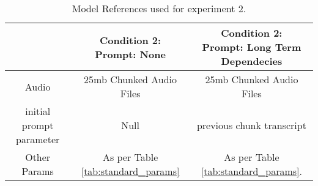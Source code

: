 

\begin{table}[ht]
    \centering
    \begin{tabular}{|c|c|c|}
        \hline
        &
        \makecell{\textbf{Condition 2:} \\Prompt: None} & \makecell{\textbf{Condition 2:} \\Prompt: Long Term Dependecies} \\
        \hline Audio & 25mb Chunked Audio Files & 25mb Chunked Audio Files \\
        \hline initial prompt parameter & Null & previous chunk transcript \\
        \hline Other Params & As per Table \ref{tab:standard_params} & As per Table \ref{tab:standard_params}. \\
        
  \hline

    \end{tabular}
    \caption{Model References used for experiment 2.}
    \label{tab:experiment_2}
\end{table}